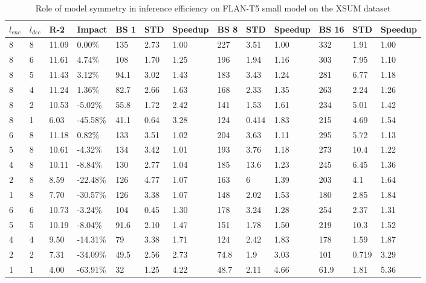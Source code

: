 \begin{table*}[!ht]
    \centering
    \caption{Role of model symmetry in inference efficiency on FLAN-T5 small model on the XSUM dataset}
    \small
    \begin{tabular}{|l|l|l|l|l|l|l|l|l|l|l|l|l|}
    \hline
         $l_{enc}$ & $l_{dec}$ & R-2 & Impact & BS 1 & STD & Speedup & BS 8 & STD  & Speedup & BS 16 & STD & Speedup\\ \hline
         8 & 8 & 11.09 & 0.00\% & 135 & 2.73 & 1.00 & 227 & 3.51 & 1.00 & 332 & 1.91 & 1.00 \\ \hline
        8 & 6 & 11.61 & 4.74\% & 108 & 1.70 & 1.25 & 196 & 1.94 & 1.16 & 303 & 7.95 & 1.10 \\ \hline
        8 & 5 & 11.43 & 3.12\% & 94.1 & 3.02 & 1.43 & 183 & 3.43 & 1.24 & 281 & 6.77 & 1.18 \\ \hline
        8 & 4 & 11.24 & 1.36\% & 82.7 & 2.66 & 1.63 & 168 & 2.33 & 1.35 & 263 & 2.24 & 1.26 \\ \hline
        8 & 2 & 10.53 & -5.02\% & 55.8 & 1.72 & 2.42 & 141 & 1.53 & 1.61 & 234 & 5.01 & 1.42 \\ \hline
        8 & 1 & 6.03 & -45.58\% & 41.1 & 0.64 & 3.28 & 124 & 0.414 & 1.83 & 215 & 4.69 & 1.54 \\ \hline
        6 & 8 & 11.18 & 0.82\% & 133 & 3.51 & 1.02 & 204 & 3.63 & 1.11 & 295 & 5.72 & 1.13 \\ \hline
        5 & 8 & 10.61 & -4.32\% & 134 & 3.42 & 1.01 & 193 & 3.76 & 1.18 & 273 & 10.4 & 1.22 \\ \hline
        4 & 8 & 10.11 & -8.84\% & 130 & 2.77 & 1.04 & 185 & 13.6 & 1.23 & 245 & 6.45 & 1.36 \\ \hline
        2 & 8 & 8.59 & -22.48\% & 126 & 4.77 & 1.07 & 163 & 6 & 1.39 & 203 & 4.1 & 1.64 \\ \hline
        1 & 8 & 7.70 & -30.57\% & 126 & 3.38 & 1.07 & 148 & 2.02 & 1.53 & 180 & 2.85 & 1.84 \\ \hline
        6 & 6 & 10.73 & -3.24\% & 104 & 0.45 & 1.30 & 178 & 3.24 & 1.28 & 254 & 2.37 & 1.31 \\ \hline
        5 & 5 & 10.19 & -8.04\% & 91.6 & 2.10 & 1.47 & 151 & 1.78 & 1.50 & 219 & 10.3 & 1.52 \\ \hline
        4 & 4 & 9.50 & -14.31\% & 79 & 3.38 & 1.71 & 124 & 2.42 & 1.83 & 178 & 1.59 & 1.87 \\ \hline
        2 & 2 & 7.31 & -34.09\% & 49.5 & 2.56 & 2.73 & 74.8 & 1.9 & 3.03 & 101 & 0.719 & 3.29 \\ \hline
        1 & 1 & 4.00 & -63.91\% & 32 & 1.25 & 4.22 & 48.7 & 2.11 & 4.66 & 61.9 & 1.81 & 5.36 \\ \hline
    \end{tabular}
    \label{tab:xsum-asym-inference-small}
\end{table*}
